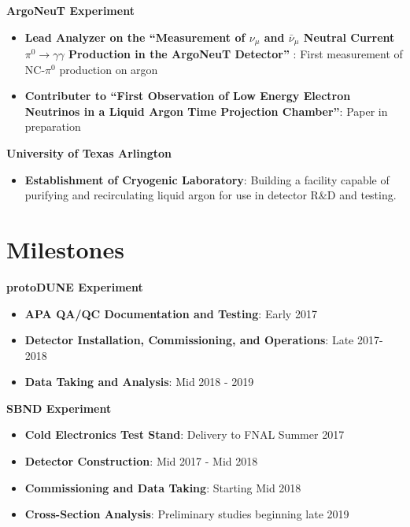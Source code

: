 \noindent\textbf{ArgoNeuT Experiment}
\begin{itemize}[noitemsep,nolistsep]
\item{\textbf{Lead Analyzer on the ``Measurement of $\nu_{\mu}$ and $\bar{\nu}_{\mu}$ Neutral Current $\pi^{0} \rightarrow \gamma\gamma$ Production in the ArgoNeuT Detector''}} : First measurement of NC-$\pi^{0}$ production on argon

\item{\textbf{Contributer to ``First Observation of Low Energy Electron Neutrinos in a Liquid Argon Time Projection Chamber''}}: Paper in preparation

\end{itemize}





\noindent\textbf{University of Texas Arlington}

\begin{itemize}[noitemsep,nolistsep]
\item{\textbf{Establishment of Cryogenic Laboratory}}: Building a facility capable of purifying and recirculating liquid argon for use in detector R$\&$D and testing.
\end{itemize}

\section*{\textbf{Milestones}}
\noindent\textbf{protoDUNE Experiment}
\begin{itemize}[noitemsep,nolistsep]
\item{\textbf{APA QA/QC Documentation and Testing}}: Early 2017
\item{\textbf{Detector Installation, Commissioning, and Operations}}: Late 2017-2018
\item{\textbf{Data Taking and Analysis}}: Mid 2018 - 2019
\end{itemize}

\noindent\textbf{SBND Experiment}
\begin{itemize}[noitemsep,nolistsep]
\item{\textbf{Cold Electronics Test Stand}}: Delivery to FNAL Summer 2017
\item{\textbf{Detector Construction}}: Mid 2017 - Mid 2018
\item{\textbf{Commissioning and Data Taking}}: Starting Mid 2018 
\item{\textbf{Cross-Section Analysis}}: Preliminary studies beginning late 2019

\end{itemize}

